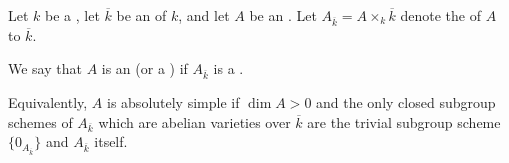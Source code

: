 \begin{definition} \label{definition:absolutely_simple_abelian_variety_over_a_field}
    Let $k$ be a , let $\overline{k}$ be an  of $k$, and let $A$ be an . Let $A_{\overline{k}} = A \times_k \overline{k}$ denote the  of $A$ to $\overline{k}$.

    We say that $A$ is an  (or a ) if $A_{\overline{k}}$ is a .

    Equivalently, $A$ is absolutely simple if $\dim A > 0$ and the only closed subgroup schemes of $A_{\overline{k}}$ which are abelian varieties over $\overline{k}$ are the trivial subgroup scheme $\{0_{A_{\overline{k}}}\}$ and $A_{\overline{k}}$ itself.
\end{definition}
